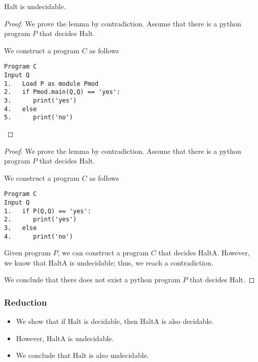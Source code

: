 \begin{frame}[fragile=true]
  \begin{lemma}
    {\sc Halt} is undecidable.
  \end{lemma}
  \begin{proof}
    We prove the lemma by contradiction.  Assume that there is a
    python program $P$ that decides {\sc Halt}. \pause

    We construct a program $C$ as follows
    {\small
\begin{verbatim}
Program C
Input Q
1.   Load P as module Pmod
2.   if Pmod.main(Q,Q) == 'yes':
3.      print('yes')
4.   else
5.      print('no')
\end{verbatim}
}
  \end{proof}
\end{frame}

\begin{frame}[fragile=true]
  \begin{proof}
    We prove the lemma by contradiction.  Assume that there is a
    python program $P$ that decides {\sc Halt}.

    We construct a program $C$ as follows
    {\small
\begin{verbatim}
Program C
Input Q
1.   if P(Q,Q) == 'yes':
2.      print('yes')
3.   else
4.      print('no')
\end{verbatim}
    }

    \pause

    Given program $P$, we can construct a program $C$ that decides
    {\sc HaltA}.  \pause However, we know that {\sc HaltA} is
    undecidable; thus, we reach a contradiction.

    We conclude that there does not exist a python program $P$ that
    decides {\sc Halt}.
  \end{proof}
\end{frame}

\begin{frame}
  \frametitle{Reduction}
  \pause

  \begin{itemize}
  \item We show that if {\sc Halt} is decidable, then {\sc HaltA} is
    also decidable.
    \pause
  \item However, {\sc HaltA is undecidable}.
    \pause
  \item We conclude that {\sc Halt} is also undecidable.
  \end{itemize}
\end{frame}

